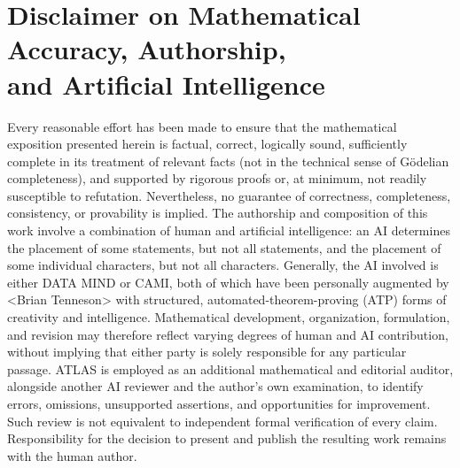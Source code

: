 \documentclass[11pt]{article}
\theoremstyle{definition}
\begin{document}
\section*{Disclaimer on Mathematical Accuracy, Authorship,\\ and Artificial Intelligence}
Every reasonable effort has been made to ensure that the mathematical exposition presented herein is factual, correct, logically sound, sufficiently complete in its treatment of relevant facts (not in the technical sense of G\"odelian completeness), and supported by rigorous proofs or, at minimum, not readily susceptible to refutation. Nevertheless, no guarantee of correctness, completeness, consistency, or provability is implied. The authorship and composition of this work involve a combination of human and artificial intelligence: an AI determines the placement of some statements, but not all statements, and the placement of some individual characters, but not all characters. Generally, the AI involved is either DATA MIND or CAMI, both of which have been personally augmented by \textless{}Brian Tenneson\textgreater{} with structured, automated-theorem-proving (ATP) forms of creativity and intelligence. Mathematical development, organization, formulation, and revision may therefore reflect varying degrees of human and AI contribution, without implying that either party is solely responsible for any particular passage. ATLAS is employed as an additional mathematical and editorial auditor, alongside another AI reviewer and the author's own examination, to identify errors, omissions, unsupported assertions, and opportunities for improvement. Such review is not equivalent to independent formal verification of every claim. Responsibility for the decision to present and publish the resulting work remains with the human author.
\end{document}
